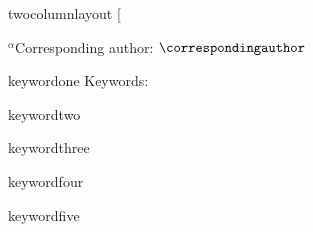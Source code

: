 \documentclass[paper=a4,twocolumn,fontsize=11pt]{article}
\begin{document}
\ifcsname twocolumnlayout\endcsname
	\twocolumn[
\fi


	


	\begin{@twocolumnfalse}	
                	\begin{minipage}{1.015\textwidth}
                		\setlength{\fboxsep}{0pt}		
                		\setlength{\fboxsep}{10pt}
                	\end{minipage} 
	\end{@twocolumnfalse}


	\Large{\fullauthorsstring}	


	\setlength{\columnseprule}{1pt}
	\def\columnseprulecolor{
		\color{articleandrunningtitlecolor}
	}
	\begin{multicols}{2}
		\small{
			\fullauthorsaffiliation
			\vfill
			$^{\alpha}$Corresponding author: $\correspondingauthor$
		}
		\columnbreak

	
		\hangindent=0.8cm %

		\hangindent=0.8cm %
		\ifcsname keywordone\endcsname
			\hspace{8mm}Keywords: \colorbox{grey}{\strut \keywordone} 
		\fi
		\ifcsname keywordtwo\endcsname
			\colorbox{grey}{\strut \keywordtwo} 
		\fi
		\ifcsname keywordthree\endcsname
			\colorbox{grey}{\strut \keywordthree} 
		\fi
		\ifcsname keywordfour\endcsname
			\colorbox{grey}{\strut \keywordfour} 
		\fi
		\ifcsname keywordfive\endcsname
			\colorbox{grey}{\strut \keywordfive} 
		\fi
		\vfill
	\end{multicols}
	\bigskip		
	
\end{document}
